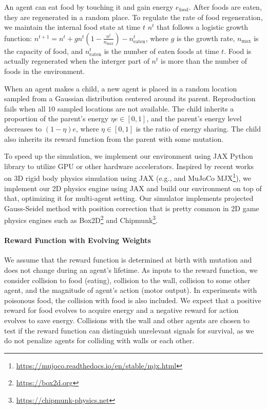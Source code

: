 An agent can eat food by touching it and gain energy $e_{\mathrm{food}}$. After foods are eaten, they are regenerated in a random place. To regulate the rate of food regeneration, we maintain the internal food state at time $t$ $n^{t}$ that follows a logistic growth function: $n^{t + 1} = n^{t} + gn^{t}(1 - \frac{n^{t}}{n_{\mathrm{max}}}) - n_{\mathrm{eaten}}^{t}$, where $g$ is the growth rate, $n_{\mathrm{max}}$ is the capacity of food, and $n_{\mathrm{eaten}}^{t}$ is the number of eaten foods at time $t$. Food is actually regenerated when the interger part of $n^{t}$ is more than the number of foods in the environment.

When an agent makes a child, a new agent is placed in a random location sampled from a Gaussian distribution centered around its parent. Reproduction fails when all $10$ sampled locations are not available.
The child inherits a proportion of the parent's energy $\eta e \in [0, 1]$, and the parent's energy level decreases to $(1-\eta)e$, where $\eta \in [0, 1]$ is the ratio of energy sharing. The child also inherits its reward function from the parent with some mutation.

To speed up the simulation, we implement our environment using JAX Python library \citep{jax2018github} to utilize GPU or other hardware accelerators. Inspired by recent works on 3D rigid body physics simulation using JAX (e.g., \citet{brax2021github} and MuJoCo \citep{todorov2012mujoco} MJX\footnote{\url{https://mujoco.readthedocs.io/en/stable/mjx.html}}), we implement our 2D physics engine using JAX and build our environment on top of that, optimizing it for multi-agent setting. Our simulator implements projected Gauss-Seidel method with position correction \citep{catto2005iterative} that is pretty common in 2D game physics engines such as Box2D\footnote{\url{https://box2d.org}} and Chipmunk\footnote{\url{https://chipmunk-physics.net}}.

\paragraph{Reward Function with Evolving Weights}
We assume that the reward function is determined at birth with mutation and does not change during an agent's lifetime. As inputs to the reward function, we consider  collision to food (eating),  collision to the wall,  collision to some other agent, and  the magnitude of agent's action (motor output). In experiments with poisonous food, the collision with food is also included.
We expect that a positive reward for food evolves to acquire energy
and a negative reward for action evolves to save energy. Collisions with the wall and other agents are chosen to test if the reward function can distinguish unrelevant signals for survival, as we do not penalize agents for colliding with walls or each other.

